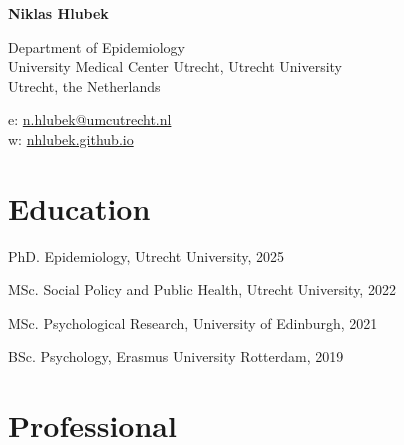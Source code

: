 \documentclass[12pt,letterpaper]{report}
\newcommand{\myname}{Niklas Hlubek}
\newcommand{\namefont}[1]{{\normalfont\bfseries\Huge{#1}}}
\begin{document}
    \raggedright

    \namefont{\myname}

    \vspace{1em}
    \begin{minipage}[t]{0.64\textwidth}
        Department of Epidemiology \\
        University Medical Center Utrecht, Utrecht University
        \\ Utrecht, the Netherlands
    \end{minipage}
    \begin{minipage}[t]{0.34\textwidth}
        e: \href{mailto:n.hlubek@umcutrecht.nl}{n.hlubek@umcutrecht.nl} \\
        w: \href{https://nhlubek.github.io/}{nhlubek.github.io}
    \end{minipage}
    \vspace{0.5em}

    \section*{Education}

    \begin{tablist}

        \item[PhD.]  \tab Epidemiology, Utrecht University, 2025

        \item[MSc.]  \tab Social Policy and Public Health, Utrecht University, 2022

        \item[MSc.]  \tab Psychological Research, University of Edinburgh, 2021

        \item[BSc.]  \tab Psychology, Erasmus University Rotterdam, 2019

    \end{tablist}

    \section*{Professional}
\end{document}
